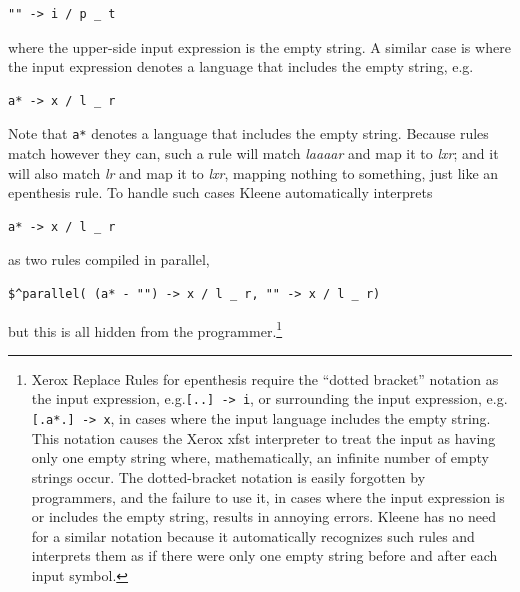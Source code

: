 \begin{Verbatim}
"" -> i / p _ t
\end{Verbatim}

\noindent
where the upper-side input expression is the empty string.  A similar case is where the input expression denotes a
language that includes the empty string, e.g.

\begin{Verbatim}
a* -> x / l _ r
\end{Verbatim}

\noindent
Note that \verb!a*! denotes a language that includes the empty string.
Because rules match however they can, such a rule will match \emph{laaaar} and map it to \emph{lxr}; and it will also
match \emph{lr} and map it to \emph{lxr}, mapping nothing to
something, just like an epenthesis rule.  To handle such cases Kleene
automatically interprets 

\begin{Verbatim}
a* -> x / l _ r
\end{Verbatim}

\noindent
as two rules compiled in parallel, 

\begin{Verbatim}
$^parallel( (a* - "") -> x / l _ r, "" -> x / l _ r)
\end{Verbatim}

\noindent
but this is all hidden from the programmer.\footnote{Xerox Replace Rules for epenthesis require the ``dotted bracket'' notation as
the input expression, e.g.\@  \verb![..] -> i!, or surrounding the input expression, e.g.\@ \verb![.a*.] -> x!, in
cases where the input language includes the empty string.  This notation causes the Xerox xfst interpreter to treat
the input as having only one empty string where, mathematically, an infinite number of empty strings occur.  The
dotted-bracket notation is easily forgotten by programmers, and the failure to use it, in cases where the input
expression is or includes the empty string, results in annoying errors.  Kleene
has no need for a similar notation because it automatically recognizes such rules and interprets them as if there
were only one empty string before and after each input symbol.}


